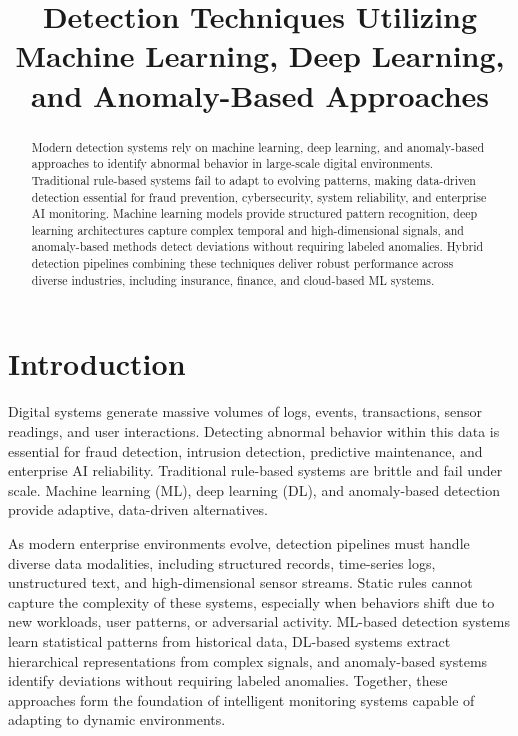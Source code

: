 \documentclass[12pt, draftclsnofoot, onecolumn]{IEEEtran}
\title{Detection Techniques Utilizing Machine Learning, Deep Learning, and Anomaly-Based Approaches}
\author{
    \IEEEauthorblockN{Rohin Solan}
    \IEEEauthorblockA{
        AI Modernization Researcher \\
        Email: solanr@acm.org
    }
}
\begin{document}
\maketitle

\begin{abstract}
Modern detection systems rely on machine learning, deep learning, and anomaly-based approaches to identify abnormal behavior in large-scale digital environments. Traditional rule-based systems fail to adapt to evolving patterns, making data-driven detection essential for fraud prevention, cybersecurity, system reliability, and enterprise AI monitoring. Machine learning models provide structured pattern recognition, deep learning architectures capture complex temporal and high-dimensional signals, and anomaly-based methods detect deviations without requiring labeled anomalies. Hybrid detection pipelines combining these techniques deliver robust performance across diverse industries, including insurance, finance, and cloud-based ML systems.
\end{abstract}

\section{Introduction}
Digital systems generate massive volumes of logs, events, transactions, sensor readings, and user interactions. Detecting abnormal behavior within this data is essential for fraud detection, intrusion detection, predictive maintenance, and enterprise AI reliability. Traditional rule-based systems are brittle and fail under scale. Machine learning (ML), deep learning (DL), and anomaly-based detection provide adaptive, data-driven alternatives.

As modern enterprise environments evolve, detection pipelines must handle diverse data modalities, including structured records, time-series logs, unstructured text, and high-dimensional sensor streams. Static rules cannot capture the complexity of these systems, especially when behaviors shift due to new workloads, user patterns, or adversarial activity. ML-based detection systems learn statistical patterns from historical data, DL-based systems extract hierarchical representations from complex signals, and anomaly-based systems identify deviations without requiring labeled anomalies. Together, these approaches form the foundation of intelligent monitoring systems capable of adapting to dynamic environments.
\end{document}

